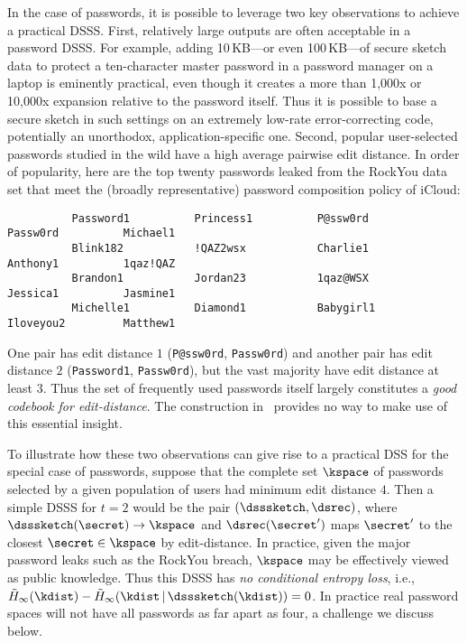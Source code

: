 In the case of passwords, it is possible to leverage two key observations to achieve a practical DSSS. 
First, relatively large outputs 
are often acceptable in a password DSSS. For example, adding 10\,KB---or even 100\,KB---of
secure sketch data to protect a ten-character master password in a password
manager on a laptop is eminently practical, even though it creates a more than
1,000x or 10,000x expansion relative to the password itself. Thus it is possible
to base a secure sketch in such settings on an extremely low-rate
error-correcting code, potentially an unorthodox, application-specific one.
Second, popular user-selected passwords studied in the
wild have a high average pairwise edit distance. In order of popularity, here
are the top twenty passwords leaked from the RockYou data set that meet the
(broadly representative) password composition policy of iCloud:\vspace*{-.4em}
{\small
\begin{verbatim}
          Password1          Princess1          P@ssw0rd          Passw0rd          Michael1   
          Blink182           !QAZ2wsx           Charlie1          Anthony1          1qaz!QAZ  
          Brandon1           Jordan23           1qaz@WSX          Jessica1          Jasmine1
          Michelle1          Diamond1           Babygirl1         Iloveyou2         Matthew1
\end{verbatim}
}
\vspace*{-.4em}\noindent
One pair has edit distance $1$ ({\tt P@ssw0rd}, {\tt Passw0rd}) and another pair has edit distance $2$ ({\tt Password1}, {\tt Passw0rd}), but the vast majority have edit distance  at least $3$. Thus the set of frequently used passwords itself largely constitutes a {\em good codebook for edit-distance}. The construction in~\cite{DORS08} provides no way to make use of this essential insight.

To illustrate how these two observations can give rise to a practical DSS for
the special case of passwords, suppose that the complete set $\kspace$ of
passwords selected by a given population of users had minimum edit distance $4$.
Then a simple DSSS for $t = 2$ would be the pair $(\dsssketch, \dsrec)$, where
$\dsssketch(\secret) \rightarrow \kspace$ and $\dsrec(\secret')$ maps $\secret'$
to the closest $\secret \in \kspace$ by edit-distance. In practice, given the
major password leaks such as the RockYou breach, $\kspace$ may be effectively
viewed as public knowledge. Thus this DSSS has {\em no conditional entropy
loss}, i.e., $\tilde{H}_{\infty} (\kdist) -  \tilde{H}_{\infty} (\kdist \,|\,
\dsssketch(\kdist)) = 0$. In practice real password spaces will not have all
passwords as far apart as four, a challenge we discuss below.

